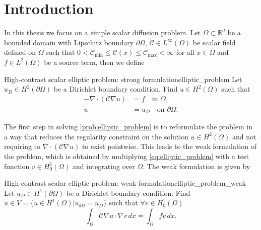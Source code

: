 \chapter{Introduction}\label{ch:introduction}
In this thesis we focus on a simple scalar diffusion problem. Let $\Omega\subset\mathbb{R}^d$ be a bounded domain with Lipschitz boundary $\partial\Omega$, $\mathcal{C}\in L^\infty(\Omega)$ be scalar field defined on $\Omega$ such that $0 < \mathcal{C}_{\min} \leq \mathcal{C}(x) \leq \mathcal{C}_{\max} < \infty$ for all $x\in\Omega$ and $f\in L^2(\Omega)$ be a source term, then we define
\begin{fancyprob}{High-contrast scalar elliptic problem: strong formulation}{elliptic_problem}
    Let $u_D\in H^2(\partial\Omega)$ be a Dirichlet boundary condition. Find $u\in H^2(\Omega)$ such that
    \begin{equation}
        \begin{aligned}
            -\nabla\cdot\left(\mathcal{C}\nabla u\right) & = f \quad \text{in } \Omega,           \\
            u                                       & = u_D \quad \text{on } \partial\Omega.
        \end{aligned}
        \label{eq:elliptic_problem}
    \end{equation}
\end{fancyprob}

The first step in solving \cref{prob:elliptic_problem} is to reformulate the problem in a way that reduces the regularity constraint on the solution $u\in H^2(\Omega)$ and not requiring to $\nabla\cdot\left(\mathcal{C}\nabla u\right)$ to exist pointwise. This leads to the weak formulation of the problem, which is obtained by multiplying \cref{eq:elliptic_problem} with a test function $v\in H^1_0(\Omega)$ and integrating over $\Omega$. The weak formulation is given by
\begin{fancyprob}{High-contrast scalar elliptic problem: weak formulation}{elliptic_problem_weak}
    Let $u_D\in H^1(\partial\Omega)$ be a Dirichlet boundary condition. Find $u\in V = \{u\in H^1(\Omega) | u_{\delta \Omega} = u_D\}$ such that $\forall v \in H^1_0(\Omega)$
    \begin{equation}
        \label{eq:galerkin}
        \int_\Omega \mathcal{C}\nabla u\cdot\nabla v\,dx = \int_\Omega f v\,dx.
    \end{equation}
\end{fancyprob}

